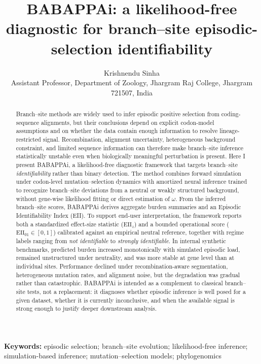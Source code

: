 \documentclass[11pt]{article}
\title{\textbf{BABAPPAi: a likelihood-free diagnostic for branch--site episodic-selection identifiability}}
\author{%
Krishnendu Sinha\\
Assistant Professor, Department of Zoology, Jhargram Raj College, Jhargram 721507, India
}
\date{}
\begin{document}
\maketitle

\begin{abstract}
Branch--site methods are widely used to infer episodic positive selection from coding-sequence alignments, but their conclusions depend on explicit codon-model assumptions and on whether the data contain enough information to resolve lineage-restricted signal. Recombination, alignment uncertainty, heterogeneous background constraint, and limited sequence information can therefore make branch--site inference statistically unstable even when biologically meaningful perturbation is present. Here I present BABAPPAi, a likelihood-free diagnostic framework that targets branch--site \emph{identifiability} rather than binary detection. The method combines forward simulation under codon-level mutation--selection dynamics with amortized neural inference trained to recognize branch--site deviations from a neutral or weakly structured background, without gene-wise likelihood fitting or direct estimation of $\omega$. From the inferred branch--site scores, BABAPPAi derives aggregate burden summaries and an Episodic Identifiability Index (EII). To support end-user interpretation, the framework reports both a standardized effect-size statistic ($\mathrm{EII}_{z}$) and a bounded operational score ($\mathrm{EII}_{01}\in[0,1]$) calibrated against an empirical neutral reference, together with regime labels ranging from \emph{not identifiable} to \emph{strongly identifiable}. In internal synthetic benchmarks, predicted burden increased monotonically with simulated episodic load, remained unstructured under neutrality, and was more stable at gene level than at individual sites. Performance declined under recombination-aware segmentation, heterogeneous mutation rates, and alignment noise, but the degradation was gradual rather than catastrophic. BABAPPAi is intended as a complement to classical branch--site tests, not a replacement: it diagnoses whether episodic inference is well posed for a given dataset, whether it is currently inconclusive, and when the available signal is strong enough to justify deeper downstream analysis.
\end{abstract}

\noindent\textbf{Keywords:} episodic selection; branch--site evolution; likelihood-free inference; simulation-based inference; mutation--selection models; phylogenomics
\end{document}

